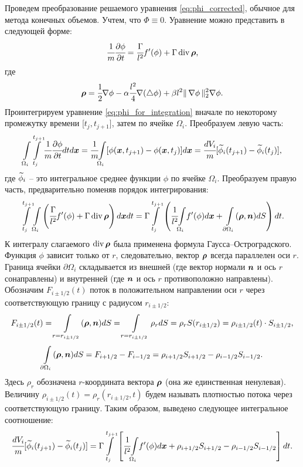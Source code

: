 Проведем преобразование решаемого уравнения \eqref{eq:phi_corrected}, обычное для метода конечных объемов. Учтем, что $\Phi \equiv 0$. Уравнение можно представить в следующей форме:
\begin{equation}
	\cfrac{1}{m} \cfrac{\partial \phi}{\partial t} = \cfrac{\Gamma}{l^2} f'(\phi) + \Gamma \operatorname{{div}} {\boldsymbol{\rho}} {\text{,}}
	\label{eq:phi_for_integration}
\end{equation}
где
\begin{equation}
	{\boldsymbol{\rho}} = \cfrac{1}{2} \nabla \phi - \alpha \cfrac{l^2}{4} \nabla (\triangle \phi) + \beta l^2 \| \, \nabla \phi \, \|_2^2 \nabla \phi {\text{.}}
	\label{eq:rho}
\end{equation}
Проинтегрируем уравнение \eqref{eq:phi_for_integration} вначале по некоторому промежутку времени [$t_j, t_{j + 1}]$, затем по ячейке $\Omega_i$. Преобразуем левую часть:
$${\int\limits_{\Omega_i}} {\int\limits_{t_j}^{t_{j + 1}}} \cfrac{1}{m} \cfrac{\partial \phi}{\partial t} dt d {\boldsymbol{x}} = \cfrac{1}{m} {\int\limits_{\Omega_i}} [\phi({\boldsymbol{x}}, t_{j + 1}) - \phi({\boldsymbol{x}}, t_j)] d {\boldsymbol{x}} = \cfrac{dV_i}{m} [{\widetilde{\phi}}_i(t_{j + 1}) - {\widetilde{\phi}}_i(t_j)] {\text{,}}$$
где ${\widetilde{\phi}}_i$ -- это интегральное среднее функции $\phi$ по ячейке $\Omega_i$. Преобразуем правую часть, предварительно поменяв порядок интегрирования:
$${\int\limits_{t_j}^{t_{j + 1}}} {\int\limits_{\Omega_i}} \left( \cfrac{\Gamma}{l^2} f'(\phi) + \Gamma \operatorname{{div}} {\boldsymbol{\rho}} \right) d {\boldsymbol{x}} dt = \Gamma {\int\limits_{t_j}^{t_{j + 1}}} \left( \cfrac{1}{l^2} {\int\limits_{\Omega_i}} f'(\phi) d {\boldsymbol{x}} + \int\limits_{\partial \Omega_i} ({\boldsymbol{\rho}}, {\boldsymbol{n}}) dS \right) dt {\text{.}}$$
К интегралу слагаемого $\operatorname{{div}} {\boldsymbol{\rho}}$ была применена формула Гаусса--Остроград\-ского. Функция $\phi$ зависит только от $r$, следовательно, вектор ${\boldsymbol{\rho}}$ всегда параллелен оси $r$. Граница ячейки $\partial \Omega_i$ складывается из внешней (где вектор нормали ${\boldsymbol{n}}$ и ось $r$ сонаправлены) и внутренней (где ${\boldsymbol{n}}$ и ось $r$ противоположно направлены). Обозначим $F_{i \pm 1/2}(t)$ поток в положительном направлении оси $r$ через соответствующую границу с радиусом $r_{i \pm 1/2}$:
$$F_{i \pm 1/2}(t) = \int\limits_{r = r_{i \pm 1/2}} ({\boldsymbol{\rho}}, {\boldsymbol{n}}) dS = \int\limits_{r = r_{i \pm 1/2}} \rho_r dS = \rho_r S(r_{i \pm 1/2}) = \rho_{i \pm 1/2}(t) \cdot S_{i \pm 1/2} {\text{,}}$$
$$\int\limits_{\partial \Omega_i} ({\boldsymbol{\rho}}, {\boldsymbol{n}}) dS = F_{i + 1/2} - F_{i - 1/2} = \rho_{i + 1/2} S_{i + 1/2} - \rho_{i - 1/2} S_{i - 1/2} {\text{.}}$$
Здесь $\rho_r$ обозначена $r$-координата вектора ${\boldsymbol{\rho}}$ (она же единственная ненулевая). Величину $\rho_{i \pm 1/2}(t) = \rho_r(r_{i \pm 1/2}, t)$ будем называть плотностью потока через соответствующую границу. Таким образом, выведено следующее интегральное соотношение:
\begin{equation}
	\cfrac{dV_i}{m} [{\widetilde{\phi}}_i(t_{j + 1}) - {\widetilde{\phi}}_i(t_j)] = \Gamma {\int\limits_{t_j}^{t_{j + 1}}} \left[ \cfrac{1}{l^2} {\int\limits_{\Omega_i}} f'(\phi) d {\boldsymbol{x}} + \rho_{i + 1/2} S_{i + 1/2} - \rho_{i - 1/2} S_{i - 1/2} \right] dt {\text{.}}
	\label{eq:finite_volume_integral}
\end{equation}

